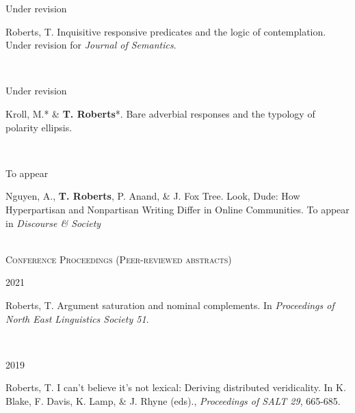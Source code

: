 \documentclass[12pt]{article} %
\begin{document}
\begin{minipage}[t]{3cm}
	Under revision
\end{minipage}
\begin{minipage}[t]{\smallertextwidth}
	Roberts, T. Inquisitive responsive predicates and the logic of contemplation. Under revision for \textit{Journal of Semantics}.\end{minipage}\\

\begin{minipage}[t]{3cm}
	Under revision
\end{minipage}
\begin{minipage}[t]{\smallertextwidth}
	Kroll, M.* \& \textbf{T. Roberts}*. Bare adverbial responses and the typology of polarity ellipsis. \end{minipage}\\

\begin{minipage}[t]{3cm}
	To appear
\end{minipage}
\begin{minipage}[t]{\smallertextwidth}
	Nguyen, A., \textbf{T. Roberts}, P. Anand, \& J. Fox Tree. Look, Dude: How Hyperpartisan and Nonpartisan Writing Differ in Online Communities. To appear in \textit{Discourse \& Society} \end{minipage}\\


\textsc{Conference Proceedings (Peer-reviewed abstracts)}\\

\begin{minipage}[t]{3cm}
	2021
\end{minipage}
\begin{minipage}[t]{\smallertextwidth}
	Roberts, T. Argument saturation and nominal complements. In \textit{Proceedings of North East Linguistics Society 51}. \end{minipage}\\


\begin{minipage}[t]{3cm}
2019
\end{minipage}
\begin{minipage}[t]{\smallertextwidth}
Roberts, T. I can't believe it's not lexical: Deriving distributed veridicality. In K. Blake, F. Davis, K. Lamp, \& J. Rhyne (eds)., \textit{Proceedings of SALT 29}, 665-685. \end{minipage}\\
\end{document}
